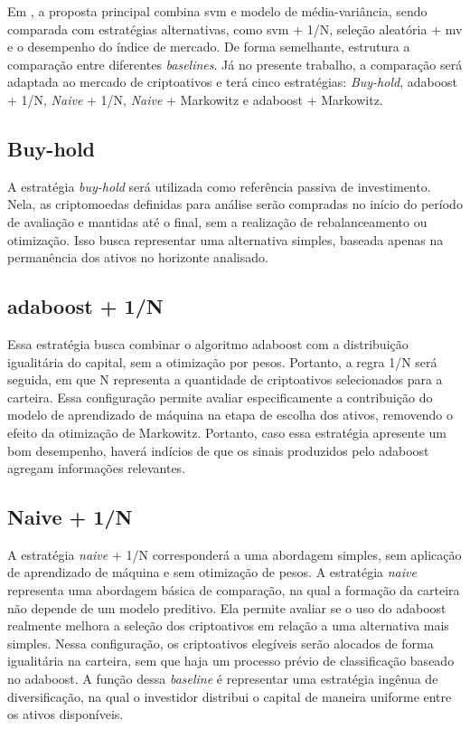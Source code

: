 Em , a proposta principal combina \acs{svm} e modelo de média-variância, sendo comparada com estratégias alternativas, como \acs{svm} + 1/N, seleção aleatória + \acs{mv} e o desempenho do índice de mercado. De forma semelhante,  estrutura a comparação entre diferentes \textit{baselines}. Já no presente trabalho, a comparação será adaptada ao mercado de criptoativos e terá cinco estratégias: \textit{Buy-hold}, \acs{adaboost} + 1/N, \textit{Naive} + 1/N, \textit{Naive} + Markowitz e \acs{adaboost} + Markowitz.

\subsection{Buy-hold}
\label{subsec_buy_hold}

A estratégia \textit{buy-hold} será utilizada como referência passiva de investimento. Nela, as criptomoedas definidas para análise serão compradas no início do período de avaliação e mantidas até o final, sem a realização de rebalanceamento ou otimização. Isso busca representar uma alternativa simples, baseada apenas na permanência dos ativos no horizonte analisado.

\subsection{\acs{adaboost} + 1/N}
\label{subsec_adaboost_1n}

Essa estratégia busca combinar o algoritmo \acs{adaboost} com a distribuição igualitária do capital, sem a otimização por pesos. Portanto, a regra 1/N será seguida, em que N representa a quantidade de criptoativos selecionados para a carteira. Essa configuração permite avaliar especificamente a contribuição do modelo de aprendizado de máquina na etapa de escolha dos ativos, removendo o efeito da otimização de Markowitz. Portanto, caso essa estratégia apresente um bom desempenho, haverá indícios de que os sinais produzidos pelo \acs{adaboost} agregam informações relevantes.

\subsection{Naive + 1/N}
\label{subsec_naive_1n}

A estratégia \textit{naive} + 1/N corresponderá a uma abordagem simples, sem aplicação de aprendizado de máquina e sem otimização de pesos. A estratégia \textit{naive} representa uma abordagem básica de comparação, na qual a formação da carteira não depende de um modelo preditivo. Ela permite avaliar se o uso do \acs{adaboost} realmente melhora a seleção dos criptoativos em relação a uma alternativa mais simples. Nessa configuração, os criptoativos elegíveis serão alocados de forma igualitária na carteira, sem que haja um processo prévio de classificação baseado no \acs{adaboost}. A função dessa \textit{baseline} é representar uma estratégia ingênua de diversificação, na qual o investidor distribui o capital de maneira uniforme entre os ativos disponíveis.

